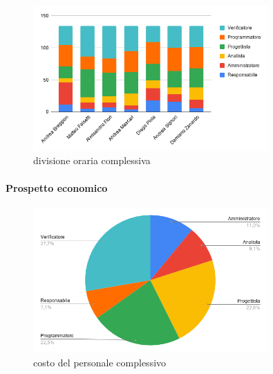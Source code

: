         \def\hourlycontent{
            {Andrea Breggion,11,35,7,18,33,30,134},
            {Matteo Falsetti,5,10,8,43,20,48,134},
            {Alessandro Flori,7,8,10,36,22,51,134},
            {Andrea Mascari,4,6,19,33,33,39,134},
            {Diego Piola,18,19,12,26,34,25,134},
            {Andrea Signori,16,12,10,26,36,34,134},
            {Damiano Zanardo,6,13,19,30,33,33,134},
            {Ore totali,67,103,85,212,211,260,938},
        }
         
        \begin{figure}[H]
            \centering
            \includegraphics[width=0.8\textwidth]{source/img/totale_orari.png}
            \caption{divisione oraria complessiva}
        \end{figure}
        \paragraph{Prospetto economico}
        
        \def\salarycontent{
            {Amministratore,103,20,2060},
            {Analista,85,25,2125},
            {Progettista,212,22,4664},
            {Programmatore,211,15,3165},
            {Responsabile,67,30,2010},
            {Verificatore,260,15,3900},
            {Totale,938,127,17924},
        }
        
        \begin{figure}[H]
            \centering
            \includegraphics[width=0.8\textwidth]{source/img/totale_ruoli.png}
            \caption{costo del personale complessivo}
        \end{figure}
